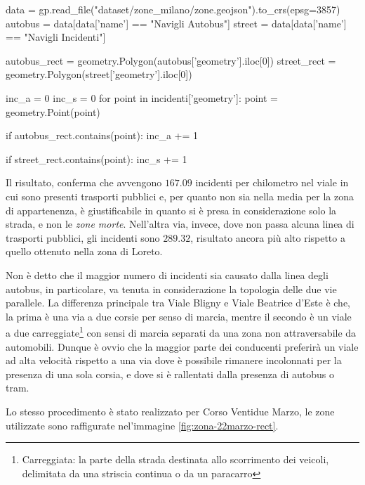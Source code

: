 \documentclass[a4paper,12pt]{report}
\newcommand{\quotestyle}[1]{\textit{#1}}
\begin{document}
\begin{code}
data = gp.read_file("dataset/zone_milano/zone.geojson").to_crs(epsg=3857)
autobus = data[data['name'] == "Navigli Autobus"]
street = data[data['name'] == "Navigli Incidenti"]

autobus_rect = geometry.Polygon(autobus['geometry'].iloc[0])
street_rect = geometry.Polygon(street['geometry'].iloc[0])

inc_a = 0
inc_s = 0
for point in incidenti['geometry']: 
    point = geometry.Point(point)

    if autobus_rect.contains(point): 
        inc_a += 1
        
    if street_rect.contains(point): 
        inc_s += 1
\end{code}

Il risultato, conferma che avvengono $167.09$ incidenti per chilometro 
nel viale in cui sono presenti trasporti pubblici e, per quanto non sia nella media per la zona 
di appartenenza, è giustificabile in quanto si è presa in considerazione solo la strada, 
e non le \quotestyle{zone morte}.
Nell'altra via, invece, dove non passa alcuna linea di trasporti pubblici, 
gli incidenti sono $289.32$, risultato ancora più alto rispetto a quello ottenuto 
nella zona di Loreto. 

Non è detto che il maggior numero di incidenti sia causato dalla linea degli autobus, 
in particolare, va tenuta in considerazione la topologia delle due vie parallele.
La differenza principale tra Viale Bligny e Viale Beatrice d'Este è che, la prima è una via a due 
corsie per senso di marcia, mentre il secondo è un viale a due 
carreggiate\footnote{Carreggiata: la parte della strada destinata allo scorrimento dei veicoli, 
delimitata da una striscia continua o da un paracarro} 
con sensi di marcia separati da una zona non attraversabile da automobili. 
Dunque è ovvio che la maggior parte dei conducenti preferirà un viale ad alta velocità 
rispetto a una via dove è possibile rimanere incolonnati per la presenza di una sola 
corsia, e dove si è rallentati dalla presenza di autobus o tram.

Lo stesso procedimento è stato realizzato per Corso Ventidue Marzo, le zone utilizzate sono 
raffigurate nel'immagine \ref{fig:zona-22marzo-rect}. 
\end{document}
